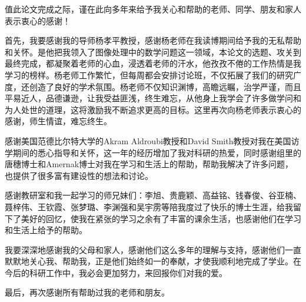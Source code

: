 \begin{thanks}

值此论文完成之际，谨在此向多年来给予我关心和帮助的老师、同学、朋友和家人表示衷心的感谢！

首先，我要感谢我的导师杨孝平教授，感谢杨老师在我读博期间给予我的无私帮助和关怀。是他把我领入了图像处理中的数学问题这一领域，本论文的选题、攻关到最终完成，都凝聚着老师的心血，浸透着老师的汗水，他孜孜不倦的工作热情是我学习的榜样。杨老师工作繁忙，但每周都会安排讨论班，不仅拓展了我们的研究广度，还创造了良好的学术氛围。杨老师不仅知识渊博，高瞻远瞩，治学严谨，而且平易近人，品德谦逊，让我受益匪浅，终生难忘，从他身上我学会了许多做学问和为人处世的道理，这将激励我不断追求更高的目标。这里再次向杨老师表示衷心的感谢，师生情谊，难忘终生。

感谢美国范德比尔特大学的Akram Aldroubi教授和David Smith教授对我在美国访学期间的悉心指导和关怀，这一年的经历增加了我对科研的热爱，同时感谢组里的唐穗博士和Amernak博士对我在学习和生活上的帮助，帮助我解决了许多问题，也提供了很多富有建设性的想法和讨论。

感谢教研室和我一起学习的师兄妹们：李旭、贵鹿颖、高益铭、钱春俊、谷亚楠、聂梓伟、王钦霞、张梦璐、李渊强和吴宇雳等陪我度过了快乐的博士生涯，给我留下了美好的回忆，使我在紧张的学习之余有了丰富的课余生活，也感谢他们在学习和生活上给予的帮助。

我要深深地感谢我的父母和家人，感谢他们这么多年的理解与支持，感谢他们一直默默地关心我、帮助我，正是他们始终如一的奉献，才使我顺利地完成了学业。在今后的科研工作中，我必会更加努力，来回报你们对我的爱。

最后，再次感谢所有帮助过我的老师和朋友。

\end{thanks}